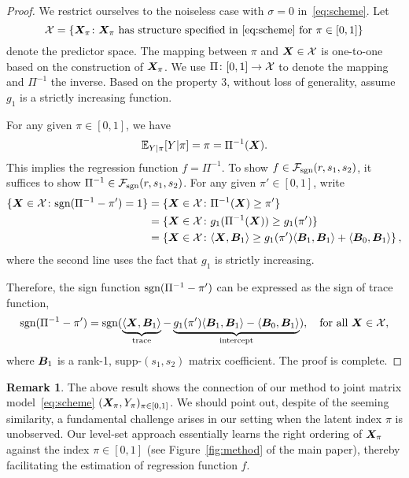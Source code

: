 \documentclass[11pt]{article}
\newcommand*{\KeepStyleUnderBrace}[1]{%
\mathop{%
\mathchoice
{\underbrace{\displaystyle#1}}%
{\underbrace{\textstyle#1}}%
{\underbrace{\scriptstyle#1}}%
{\underbrace{\scriptscriptstyle#1}}%
}\limits
}
\theoremstyle{plain}
\theoremstyle{definition}
\newtheorem{rmk}{Remark}
\def\caliF{\tF_{\textup{sgn}}}
\def\sign{\textup{sgn}}
\def\caliF{\tF_{\textup{sgn}}}
\begin{document}
\begin{proof}
We restrict ourselves to the noiseless case with $\sigma=0$ in~\eqref{eq:scheme}. 
Let 
\[
\mathcal{X}=\{\bm X_\pi\colon \bm X_\pi \text{ has structure specified in~\eqref{eq:scheme} for $\pi\in[0,1]$}\}
\]
denote the predictor space. The mapping between $\pi$ and $\bm X\in \mathcal{X}$ is one-to-one based on the construction of $\bm X_\pi$. We use $\Pi\colon [0,1]\to \mathcal{X}$ to denote the mapping and $\Pi^{-1}$ the inverse. Based on the property 3, without loss of generality, assume $g_1$ is a strictly increasing function. 


For any given $\pi\in[0,1]$, we have
\[
\mathbb{E}_{Y|\pi}[Y|\pi]=\pi=\Pi^{-1}(\bm X).
\]
This implies the regression function $f=\Pi^{-1}$. To show $f\in \caliF(r,s_1,s_2)$, it suffices to show $\Pi^{-1}\in\caliF(r,s_1,s_2)$. For any given $\pi'\in[0,1]$, write 
\begin{align}
\{\mX\in \tX \colon \sign(\Pi^{-1}-\pi')=1\}&=\{\mX\in \tX \colon \Pi^{-1}(\mX)\geq \pi'\}\\
&=\{\mX\in \tX \colon g_1(\Pi^{-1}(\mX))\geq g_1(\pi')\}\\
&=\left\{\mX\in \tX \colon \langle \mX, \mB_1\rangle \geq g_1(\pi')\langle \mB_1,\mB_1\rangle + \langle \mB_0, \mB_1 \rangle \right\},
\end{align}
where the second line uses the fact that $g_1$ is strictly increasing. 

Therefore, the sign function $\sign(\Pi^{-1}-\pi')$ can be expressed as the sign of trace function,
\[
\sign(\Pi^{-1}-\pi')=\sign(\KeepStyleUnderBrace{\langle \mX,\mB_1 \rangle}_{\text{trace}} - \KeepStyleUnderBrace{g_1(\pi')\langle \mB_1,\mB_1\rangle-\langle \mB_0,\mB_1\rangle}_{\text{intercept}}),\quad \text{for all }\mX\in\tX,
\]
where $\bm B_1$ is a rank-1, supp-$(s_1,s_2)$ matrix coefficient. The proof is complete. 
\end{proof}

\begin{rmk}
The above result shows the connection of our method to joint matrix model~\eqref{eq:scheme} $(\bm X_\pi, Y_\pi)_{\pi\in[0,1]}$. We should point out, despite of the seeming similarity, a fundamental challenge arises in our setting when the latent index $\pi$ is unobserved. Our level-set approach essentially learns the right ordering of $\bm X_\pi$ against the index $\pi\in[0,1]$ (see Figure~\ref{fig:method} of the main paper), thereby facilitating the estimation of regression function $f$. 
\end{rmk}

\clearpage
\end{document}
